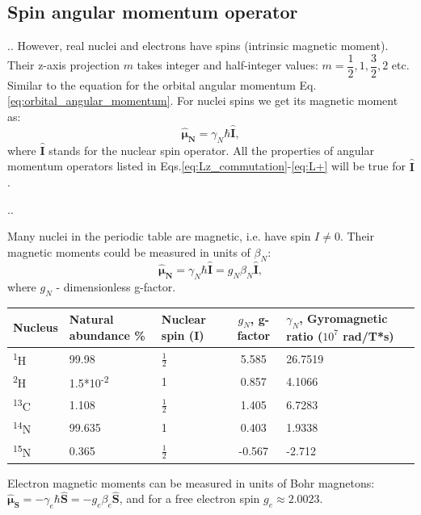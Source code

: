 \documentclass{beamer}
\begin{document}
\subsection{Spin angular momentum operator}
\begin{frame}{\thesection.\thesubsection. \insertsubsection}
	However, real nuclei and electrons have spins (intrinsic magnetic moment). Their z-axis projection $m$ takes integer and half-integer values: $m=\dfrac{1}{2}, 1, \dfrac{3}{2}, 2$ etc. Similar to the equation for the orbital angular momentum Eq.\ref{eq:orbital_angular_momentum}. For nuclei spins we get its magnetic moment as:
	\begin{equation}
		\bm{\hat{\mu}_N} = \gamma_N \hbar \bm{\hat{I}},
	\end{equation}
	where $ \bm{\hat{I}}$ stands for the nuclear spin operator. All the properties of angular momentum operators listed in Eqs.\ref{eq:Lz_commutation}-\ref*{eq:L+} will be true for $ \bm{\hat{I}}$.
\end{frame}

\begin{frame}{\thesection.\thesubsection. \insertsubsection}

 	Many nuclei in the periodic table are magnetic, i.e. have spin $I \neq 0$. Their magnetic moments could be measured in units of $\beta_N$:
		\begin{equation}
		\bm{\hat{\mu}_N} = \gamma_N \hbar \bm{\hat{I}} = g_N \beta_N \bm{\hat{I}},
		\end{equation}
		where $g_N$ - dimensionless g-factor.
		\onslide<2->
\begin{table}[ht]
	\centering
	\begin{tabular}{  C{1.0cm}  C{2.0cm}  C{1.0cm}  C{2.cm}  C{3cm}}
		\hline\hline
		Nucleus & Natural abundance \% & Nuclear spin (I) & $g_N$, g-factor & $\gamma_N$, Gyromagnetic ratio ($10^7$ rad/T*s) \\
		\hline
		\textsuperscript{1}H & 99.98 & $\frac{1}{2}$ & 5.585 & 26.7519 \\
		\textsuperscript{2}H & 1.5*10\textsuperscript{-2} & 1 & 0.857 & 4.1066 \\
		\textsuperscript{13}C & 1.108 & $\frac{1}{2}$ & 1.405 & 6.7283 \\
		\textsuperscript{14}N & 99.635 & 1 & 0.403 & 1.9338 \\
		\textsuperscript{15}N & 0.365 &  $\frac{1}{2}$ & -0.567 & -2.712 \\
		\hline
	\end{tabular}
	\label{tab:mag_properties}		
\end{table}
    Electron magnetic moments can be measured in units of Bohr magnetons: $\bm{\hat{\mu}_S} = -\gamma_e \hbar \bm{\hat{S}} = -g_e \beta_e \bm{\hat{S}}$, and for a free electron spin $g_e \approx 2.0023$.		

\end{frame}
\end{document}

